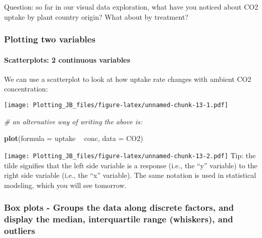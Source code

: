 \documentclass[]{article}
\newenvironment{Shaded}{\begin{snugshade}}{\end{snugshade}}
\newcommand{\CommentTok}[1]{\textcolor[rgb]{0.56,0.35,0.01}{\textit{#1}}}
\newcommand{\DataTypeTok}[1]{\textcolor[rgb]{0.13,0.29,0.53}{#1}}
\newcommand{\KeywordTok}[1]{\textcolor[rgb]{0.13,0.29,0.53}{\textbf{#1}}}
\newcommand{\NormalTok}[1]{#1}
\newcommand{\OperatorTok}[1]{\textcolor[rgb]{0.81,0.36,0.00}{\textbf{#1}}}
\newcommand{\StringTok}[1]{\textcolor[rgb]{0.31,0.60,0.02}{#1}}
\let\oldparagraph\paragraph
\renewcommand{\paragraph}[1]{\oldparagraph{#1}\mbox{}}
\begin{document}
Question: so far in our visual data exploration, what have you noticed
about CO2 uptake by plant country origin? What about by treatment?

\hypertarget{plotting-two-variables}{%
\subsubsection{Plotting two variables}\label{plotting-two-variables}}

\hypertarget{scatterplots-2-continuous-variables}{%
\paragraph{Scatterplots: 2 continuous
variables}\label{scatterplots-2-continuous-variables}}

We can use a scatterplot to look at how uptake rate changes with ambient
CO2 concentration:

\begin{Shaded}
\end{Shaded}

\texttt{[image: Plotting\_JB\_files/figure-latex/unnamed-chunk-13-1.pdf]}

\begin{Shaded}
\begin{Highlighting}[]
\CommentTok{# an alternative way of writing the above is:}

\KeywordTok{plot}\NormalTok{(}\DataTypeTok{formula =}\NormalTok{ uptake }\OperatorTok{~}\StringTok{ }\NormalTok{conc, }
     \DataTypeTok{data =}\NormalTok{ CO2)}
\end{Highlighting}
\end{Shaded}

\texttt{[image: Plotting\_JB\_files/figure-latex/unnamed-chunk-13-2.pdf]}
Tip: the tilde signifies that the left side variable is a response
(i.e., the ``y'' variable) to the right side variable (i.e., the ``x''
variable). The same notation is used in statistical modeling, which you
will see tomorrow.

\hypertarget{box-plots---groups-the-data-along-discrete-factors-and-display-the-median-interquartile-range-whiskers-and-outliers}{%
\subsubsection{Box plots - Groups the data along discrete factors, and
display the median, interquartile range (whiskers), and
outliers}\label{box-plots---groups-the-data-along-discrete-factors-and-display-the-median-interquartile-range-whiskers-and-outliers}}
\end{document}
